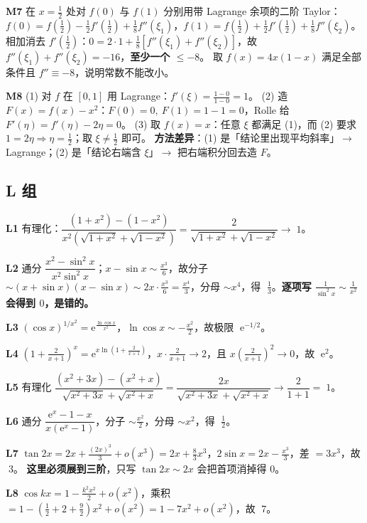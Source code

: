 \documentclass[11pt,a4paper]{ctexart}
\newcommand{\ee}{\mathrm{e}}
\newcommand{\ans}[1]{\;\boxed{#1}}
\begin{document}
\textbf{M7} 在 $x=\frac12$ 处对 $f(0)$ 与 $f(1)$ 分别用带 Lagrange 余项的二阶 Taylor：
$f(0)=f(\frac12)-\frac12f'(\frac12)+\frac18f''(\xi_1)$，$f(1)=f(\frac12)+\frac12f'(\frac12)+\frac18f''(\xi_2)$。
相加消去 $f'(\frac12)$：$0=2\cdot1+\frac18\left[f''(\xi_1)+f''(\xi_2)\right]$，故 $f''(\xi_1)+f''(\xi_2)=-16$，\textbf{至少一个 $\leq-8$}。
取 $f(x)=4x(1-x)$ 满足全部条件且 $f''\equiv-8$，说明常数不能改小。

\textbf{M8} (1) 对 $f$ 在 $[0,1]$ 用 Lagrange：$f'(\xi)=\frac{1-0}{1-0}=1$。
(2) 造 $F(x)=f(x)-x^2$：$F(0)=0,\ F(1)=1-1=0$，Rolle 给 $F'(\eta)=f'(\eta)-2\eta=0$。
(3) 取 $f(x)=x$：任意 $\xi$ 都满足 (1)，而 (2) 要求 $1=2\eta\Rightarrow\eta=\frac12$；取 $\xi\ne\frac12$ 即可。
\textbf{方法差异}：(1) 是「结论里出现平均斜率」$\to$ Lagrange；(2) 是「结论右端含 $\xi$」$\to$ 把右端积分回去造 $F$。

\subsection{L 组}

\textbf{L1} 有理化：$\dfrac{(1+x^2)-(1-x^2)}{x^2\left(\sqrt{1+x^2}+\sqrt{1-x^2}\right)}=\dfrac{2}{\sqrt{1+x^2}+\sqrt{1-x^2}}\to\ans{1}$。

\textbf{L2} 通分 $\dfrac{x^2-\sin^2x}{x^2\sin^2x}$；$x-\sin x\sim\frac{x^3}6$，故分子 $\sim(x+\sin x)(x-\sin x)\sim 2x\cdot\frac{x^3}6=\frac{x^4}3$，分母 $\sim x^4$，得 $\ans{\frac13}$。\textbf{逐项写 $\frac1{\sin^2x}\sim\frac1{x^2}$ 会得到 $0$，是错的。}

\textbf{L3} $(\cos x)^{1/x^2}=\ee^{\frac{\ln\cos x}{x^2}}$，$\ln\cos x\sim-\frac{x^2}2$，故极限 $\ans{\ee^{-1/2}}$。

\textbf{L4} $\left(1+\frac2{x+1}\right)^x=\ee^{x\ln(1+\frac2{x+1})}$，$x\cdot\frac2{x+1}\to2$，且 $x\left(\frac2{x+1}\right)^2\to0$，故 $\ans{\ee^2}$。

\textbf{L5} 有理化 $\dfrac{(x^2+3x)-(x^2+x)}{\sqrt{x^2+3x}+\sqrt{x^2+x}}=\dfrac{2x}{\sqrt{x^2+3x}+\sqrt{x^2+x}}\to\dfrac2{1+1}=\ans{1}$。

\textbf{L6} 通分 $\dfrac{\ee^x-1-x}{x(\ee^x-1)}$，分子 $\sim\frac{x^2}2$，分母 $\sim x^2$，得 $\ans{\frac12}$。

\textbf{L7} $\tan2x=2x+\frac{(2x)^3}3+o(x^3)=2x+\frac83x^3$，$2\sin x=2x-\frac{x^3}3$，差 $=3x^3$，故 $\ans{3}$。
\textbf{这里必须展到三阶}，只写 $\tan2x\sim2x$ 会把首项消掉得 $0$。

\textbf{L8} $\cos kx=1-\frac{k^2x^2}2+o(x^2)$，乘积 $=1-\left(\frac12+2+\frac92\right)x^2+o(x^2)=1-7x^2+o(x^2)$，故 $\ans{7}$。
\end{document}
